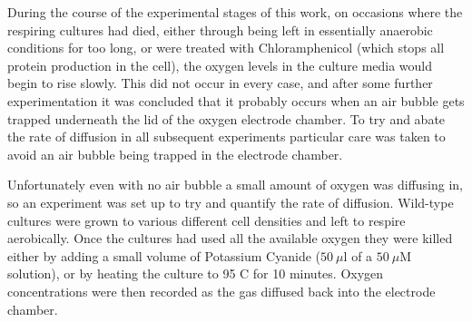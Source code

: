 During the course of the experimental stages of this work, on occasions where the respiring cultures had died, either through being left in essentially anaerobic conditions for too long, or were treated with Chloramphenicol (which stops all protein production in the cell), the oxygen levels in the culture media would begin to rise slowly. This did not occur in every case, and after some further experimentation it was concluded that it probably occurs when an air bubble gets trapped underneath the lid of the oxygen electrode chamber. To try and abate the rate of diffusion in all subsequent experiments particular care was taken to avoid an air bubble being trapped in the electrode chamber.

Unfortunately even with no air bubble a small amount of oxygen was diffusing in, so an experiment was set up to try and quantify the rate of diffusion. Wild-type \Nm{} cultures were grown to various different cell densities and left to respire aerobically. Once the cultures had used all the available oxygen they were killed either by adding a small volume of Potassium Cyanide ($50~\mu \mathrm{l}$ of a $50~\mu \mathrm{M}$ solution), or by heating the culture to 95 \textdegree{}C for 10 minutes. Oxygen concentrations were then recorded as the gas diffused back into the electrode chamber.%

